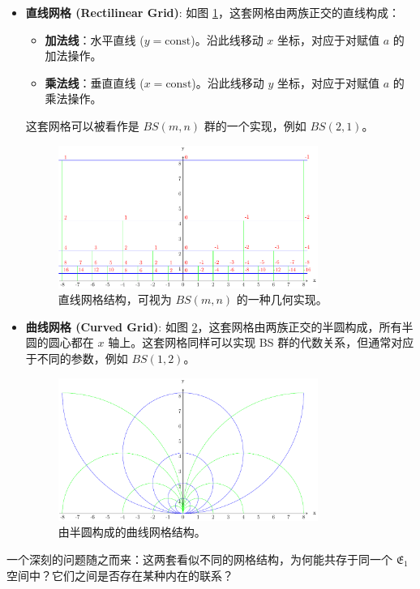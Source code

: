 \documentclass[a4paper,12pt]{book}
\numberwithin{problem}{section}
\numberwithin{definition}{section}
\numberwithin{lemma}{section}
\numberwithin{proposition}{section}
\numberwithin{theorem}{section}
\numberwithin{grammar}{section}
\numberwithin{program}{section}
\numberwithin{convention}{section}
\numberwithin{corollary}{section}
\begin{document}
\begin{itemize}
    \item \textbf{直线网格 (Rectilinear Grid)}: 如图 \ref{fig:grid1_rectilinear}，这套网格由两族正交的直线构成：
    \begin{itemize}
        \item \textbf{加法线}：水平直线 ($y=\text{const}$)。沿此线移动 $x$ 坐标，对应于对赋值 $a$ 的加法操作。
        \item \textbf{乘法线}：垂直直线 ($x=\text{const}$)。沿此线移动 $y$ 坐标，对应于对赋值 $a$ 的乘法操作。
    \end{itemize}
    这套网格可以被看作是 $BS(m,n)$ 群的一个实现，例如 $BS(2,1)$。

    \begin{figure}[ht]
        \centering
        \includegraphics[width=0.8\textwidth]{../images/01-grid-example-1} %
        \caption{直线网格结构，可视为 $BS(m,n)$ 的一种几何实现。}
        \label{fig:grid1_rectilinear}
    \end{figure}

    \item \textbf{曲线网格 (Curved Grid)}: 如图 \ref{fig:grid2_curved}，这套网格由两族正交的半圆构成，所有半圆的圆心都在 $x$ 轴上。这套网格同样可以实现 BS 群的代数关系，但通常对应于不同的参数，例如 $BS(1,2)$。

    \begin{figure}[ht]
        \centering
        \includegraphics[width=0.8\textwidth]{../images/18-grid-example-2} %
        \caption{由半圆构成的曲线网格结构。}
        \label{fig:grid2_curved}
    \end{figure}
\end{itemize}
一个深刻的问题随之而来：这两套看似不同的网格结构，为何能共存于同一个 $\mathfrak{E}_1$ 空间中？它们之间是否存在某种内在的联系？
\end{document}
